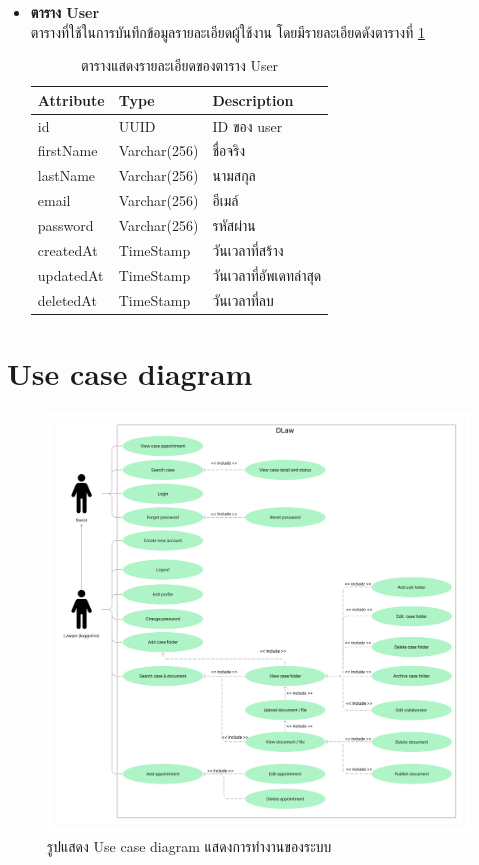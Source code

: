\documentclass[12pt,oneside,openright,a4paper]{cpe-thai-project}
\begin{document}
\begin{itemize}
\item \textbf{ตาราง User}\\
ตารางที่ใช้ในการบันทึกข้อมูลรายละเอียดผู้ใช้งาน โดยมีรายละเอียดดังตารางที่ \ref{tbl:dbUser}
\begin{table}[!ht]
    \centering
    \begin{tabular}{|p{4cm}|p{2cm}|p{6cm}|}
    \hline
    \textbf{Attribute} & \textbf{Type} & \textbf{Description}   \\ \hline
    id        & UUID        & ID ของ user            \\ \hline
    firstName & Varchar(256) & ชื่อจริง               \\ \hline
    lastName  & Varchar(256) & นามสกุล                \\ \hline
    email     & Varchar(256) & อีเมล์                 \\ \hline
    password  & Varchar(256) & รหัสผ่าน               \\ \hline
    createdAt & TimeStamp   & วันเวลาที่สร้าง        \\ \hline
    updatedAt & TimeStamp   & วันเวลาที่อัพเดทล่าสุด \\ \hline
    deletedAt & TimeStamp   & วันเวลาที่ลบ                \\ \hline
    \end{tabular}
    \caption{\centering  ตารางแสดงรายละเอียดของตาราง User} \label{tbl:dbUser}
\end{table}
\end{itemize}
\newpage
\section{Use case diagram}
\begin{figure}[!ht]\centering
    \includegraphics[width=16cm]{./assets/use-case-diagram.png}
    \caption{รูปแสดง Use case diagram แสดงการทำงานของระบบ}\label{fig:usecaseDiagram}
\end{figure}
\end{document}
